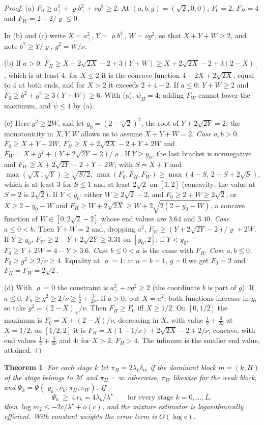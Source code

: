 \documentclass[pdflatex,sn-mathphys-ay]{sn-jnl}%
\theoremstyle{thmstyleone}%
\newtheorem{theorem}{Theorem}
\theoremstyle{thmstylethree}%
\theoremstyle{thmstyletwo}%
\begin{document}
\begin{proof}
(a) $F_0\ge a_+^2+\varrho b_+^2+\nu g^2\ge2$. At $(a,b,g)=(\sqrt2,0,0)$, $F_0=2$, $F_H=4$ and
$F_W=2-2/\varrho\le0$.

In (b) and (c) write $X=a_+^2$, $Y=\varrho b_+^2$, $W=\nu g^2$, so that $X+Y+W\ge2$, and
note $b^2\ge Y/\varrho$, $g^2=W/\nu$.

(b) If $a>0$: $F_H\ge X+2\sqrt{2X}-2+3(Y+W)\ge X+2\sqrt{2X}-2+3(2-X)_+$, which is at
least $4$: for $X\le2$ it is the concave function $4-2X+2\sqrt{2X}$, equal to $4$ at both
ends, and for $X>2$ it exceeds $2+4-2$. If $a\le0$: $Y+W\ge2$ and
$F_0\ge b^2+g^2\ge3(Y+W)\ge6$. With (a), $\psi_H=4$; adding $F_W$ cannot lower the
maximum, and $\psi\le4$ by (a).

(c) Here $g^2\ge2W$, and let $y_0=(2-\sqrt2)^2$, the root of $Y+2\sqrt{2Y}=2$; the
monotonicity in $X,Y,W$ allows us to assume $X+Y+W=2$.
\emph{Case $a,b>0$.} $F_0\ge X+Y+2W$, $F_H\ge X+2\sqrt{2X}-2+Y+2W$ and
$F_W=X+g^2+(Y+2\sqrt{2Y}-2)/\varrho$. If $Y\ge y_0$, the last bracket is nonnegative and
$F_W\ge X+2\sqrt{2Y}-2+Y+2W$; with $S=X+Y$ and $\max(\sqrt X,\sqrt Y)\ge\sqrt{S/2}$,
$\max(F_0,F_H,F_W)\ge\max(4-S,\,2-S+2\sqrt S)$, which is at least $3$ for $S\le1$ and at
least $2\sqrt2$ on $[1,2]$ (concavity; the value at $S=2$ is $2\sqrt2$). If $Y<y_0$:
either $W\ge2\sqrt2-2$, and $F_0\ge2+W\ge2\sqrt2$, or $X\ge2-y_0-W$ and
$F_H\ge W+2\sqrt{2X}\ge W+2\sqrt{2(2-y_0-W)}$, a concave function of
$W\in[0,2\sqrt2-2]$ whose end values are $3.64$ and $3.40$.
\emph{Case $a\le0<b$.} Then $Y+W=2$ and, dropping $a^2$, $F_W\ge(Y+2\sqrt{2Y}-2)/\varrho+2W$.
If $Y\ge y_0$, $F_W\ge2-Y+2\sqrt{2Y}\ge3.31$ on $[y_0,2]$; if $Y<y_0$,
$F_0\ge Y+2W=4-Y>3.6$. \emph{Case $b\le0<a$} is the same with $F_H$.
\emph{Case $a,b\le0$.} $F_0\ge g^2\ge2/\nu\ge4$.
Equality at $\varrho=1$: at $a=b=1$, $g=0$ we get $F_0=2$ and $F_H=F_W=2\sqrt2$.

(d) With $\varrho=0$ the constraint is $a_+^2+\nu g^2\ge2$ (the coordinate $b$ is part of
$g$). If $a\le0$, $F_0\ge g^2\ge2/\nu\ge\frac12+\frac3{2\nu}$. If $a>0$, put $X=a^2$; both
functions increase in $g$, so take $g^2=(2-X)_+/\nu$. Then $F_H\ge F_0$ iff $X\ge1/2$. On
$[0,1/2]$ the maximum is $F_0=X+(2-X)/\nu$, decreasing in $X$, with value
$\frac12+\frac3{2\nu}$ at $X=1/2$; on $[1/2,2]$ it is $F_H=X(1-1/\nu)+2\sqrt{2X}-2+2/\nu$,
concave, with end values $\frac12+\frac3{2\nu}$ and $4$; for $X>2$, $F_H>4$. The infimum
is the smaller end value, attained.
\end{proof}

\begin{theorem}\label{thm:mixture}
For each stage $k$ let $\pi_H=2\lambda_k\delta_m$ if the dominant block $m=(k,H)$ of the
stage belongs to $\mathcal M$ and $\pi_H=\infty$ otherwise, $\pi_W$ likewise for the weak
block, and $\Psi_k=\Psi(\varrho_k,\nu_k;\pi_H,\pi_W)$. If
\begin{equation}\label{eq:cover}
\Psi_k\ \ge\ 4\,r_k=4\lambda_k/\lambda^\star\qquad\text{for every stage }k=0,\dots,L,
\end{equation}
then $\log m_2\le-2c/\lambda^\star+o(c)$, and the mixture estimator is logarithmically
efficient. With constant weights the error term is $O(\log c)$.
\end{theorem}
\end{document}

